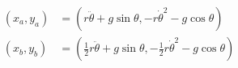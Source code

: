 \documentclass{article}
\begin{document}
\begin{align*}
(x_a, y_a) &= (r\ddot\theta + g \sin\theta, - r\dot\theta^2 - g\cos\theta)\\
(x_b, y_b) &= \left(\frac{1}{2}r\ddot\theta + g \sin\theta, - \frac{1}{2}r\dot\theta^2 - g\cos\theta\right)
\end{align*}
\end{document}
